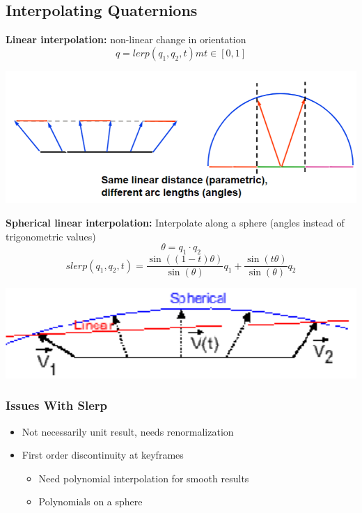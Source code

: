 \documentclass{article}
\begin{document}
\subsection*{Interpolating Quaternions}
\textbf{Linear interpolation:} non-linear change in orientation
\[q = lerp(q_1, q_2, t)m t \in [0, 1]\]
\begin{center}
    \includegraphics*[scale=0.8]{W2_8.png}
\end{center}
\textbf{Spherical linear interpolation:} Interpolate along a sphere (angles instead of trigonometric values)
\[\theta = q_1 \cdot q_2\]
\[slerp(q_1, q_2, t) = \frac{\sin((1-t)\theta)}{\sin(\theta)}q_1 + \frac{\sin(t\theta)}{\sin(\theta)}q_2\]
\begin{center}
    \includegraphics*[scale=0.8]{W2_9.png}
\end{center}


\subsubsection*{Issues With Slerp}
\begin{itemize}
    \item Not necessarily unit result, needs renormalization
    \item First order discontinuity at keyframes
    \begin{itemize}
        \item Need polynomial interpolation for smooth results
        \item Polynomials on a sphere
    \end{itemize}
\end{itemize}
\end{document}

